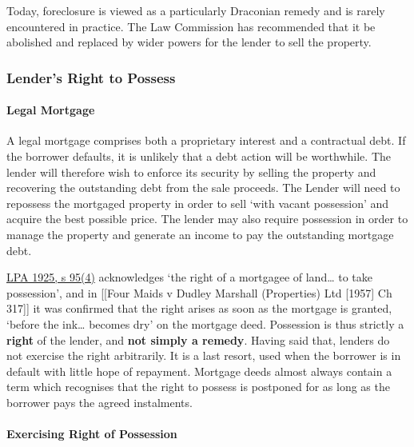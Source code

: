 \documentclass[
]{article}
\begin{document}
Today, foreclosure is viewed as a particularly Draconian remedy and is
rarely encountered in practice. The Law Commission has recommended that
it be abolished and replaced by wider powers for the lender to sell the
property.

\hypertarget{lenders-right-to-possess}{%
\subsubsection{Lender's Right to
Possess}\label{lenders-right-to-possess}}

\hypertarget{legal-mortgage}{%
\paragraph{Legal Mortgage}\label{legal-mortgage}}

A legal mortgage comprises both a proprietary interest and a contractual
debt. If the borrower defaults, it is unlikely that a debt action will
be worthwhile. The lender will therefore wish to enforce its security by
selling the property and recovering the outstanding debt from the sale
proceeds. The Lender will need to repossess the mortgaged property in
order to sell `with vacant possession' and acquire the best possible
price. The lender may also require possession in order to manage the
property and generate an income to pay the outstanding mortgage debt.

\href{https://www.legislation.gov.uk/ukpga/Geo5/15-16/20/section/95}{LPA
1925, s 95(4)} acknowledges `the right of a mortgagee of land\ldots{} to
take possession', and in {[}{[}Four Maids v Dudley Marshall (Properties)
Ltd {[}1957{]} Ch 317{]}{]} it was confirmed that the right arises as
soon as the mortgage is granted, `before the ink\ldots{} becomes dry' on
the mortgage deed. Possession is thus strictly a \textbf{right} of the
lender, and \textbf{not simply a remedy}. Having said that, lenders do
not exercise the right arbitrarily. It is a last resort, used when the
borrower is in default with little hope of repayment. Mortgage deeds
almost always contain a term which recognises that the right to possess
is postponed for as long as the borrower pays the agreed instalments.

\hypertarget{exercising-right-of-possession}{%
\paragraph{Exercising Right of
Possession}\label{exercising-right-of-possession}}
\end{document}
